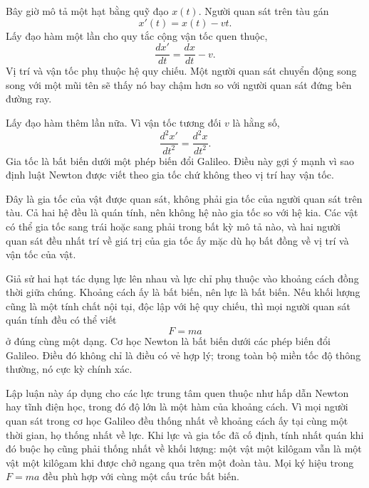 \begin{classroomqa}
\end{classroomqa}

Bây giờ mô tả một hạt bằng quỹ đạo \(x(t)\). Người quan sát trên tàu gán
\begin{equation}
x'(t)=x(t)-vt.
\end{equation}
Lấy đạo hàm một lần cho quy tắc cộng vận tốc quen thuộc,
\begin{equation}
\frac{dx'}{dt}=\frac{dx}{dt}-v.
\end{equation}
Vị trí và vận tốc phụ thuộc hệ quy chiếu. Một người quan sát chuyển động song song với một mũi tên sẽ thấy nó bay chậm hơn so với người quan sát đứng bên đường ray.

Lấy đạo hàm thêm lần nữa. Vì vận tốc tương đối \(v\) là hằng số,
\begin{equation}
\frac{d^2x'}{dt^2}=\frac{d^2x}{dt^2}.
\end{equation}
Gia tốc là bất biến dưới một phép biến đổi Galileo. Điều này gợi ý mạnh vì sao định luật Newton được viết theo gia tốc chứ không theo vị trí hay vận tốc.

Đây là gia tốc của vật được quan sát, không phải gia tốc của người quan sát trên tàu. Cả hai hệ đều là quán tính, nên không hệ nào gia tốc so với hệ kia. Các vật có thể gia tốc sang trái hoặc sang phải trong bất kỳ mô tả nào, và hai người quan sát đều nhất trí về giá trị của gia tốc ấy mặc dù họ bất đồng về vị trí và vận tốc của vật.

Giả sử hai hạt tác dụng lực lên nhau và lực chỉ phụ thuộc vào khoảng cách đồng thời giữa chúng. Khoảng cách ấy là bất biến, nên lực là bất biến. Nếu khối lượng cũng là một tính chất nội tại, độc lập với hệ quy chiếu, thì mọi người quan sát quán tính đều có thể viết
\begin{equation}
F=ma
\end{equation}
ở đúng cùng một dạng. Cơ học Newton là bất biến dưới các phép biến đổi Galileo. Điều đó không chỉ là điều có vẻ hợp lý; trong toàn bộ miền tốc độ thông thường, nó cực kỳ chính xác.

Lập luận này áp dụng cho các lực trung tâm quen thuộc như hấp dẫn Newton hay tĩnh điện học, trong đó độ lớn là một hàm của khoảng cách. Vì mọi người quan sát trong cơ học Galileo đều thống nhất về khoảng cách ấy tại cùng một thời gian, họ thống nhất về lực. Khi lực và gia tốc đã cố định, tính nhất quán khi đó buộc họ cũng phải thống nhất về khối lượng: một vật một kilôgam vẫn là một vật một kilôgam khi được chở ngang qua trên một đoàn tàu. Mọi ký hiệu trong \(F=ma\) đều phù hợp với cùng một cấu trúc bất biến.

